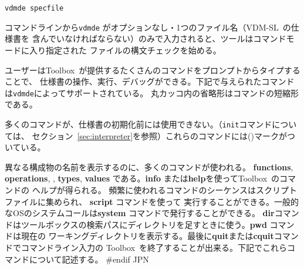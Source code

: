 \documentclass[\pformat,12pt]{article}
\newcommand{\vdmslpp}{VDM-SL}
\newcommand{\Toolbox}{Toolbox}
\newcommand{\vdmde}{vdmde}
\newcommand{\vdmslpp}{VDM++}
\newcommand{\Toolbox}{Toolbox}
\newcommand{\vdmde}{vppde}
\newcommand{\cmd}{\tt }
\begin{document}
{\tt \vdmde\ specfile}

コマンドラインから{\tt \vdmde} がオプションなし・1つのファイル名（\vdmslpp\ の仕様書を
含んでいなければならない）のみで入力されると、ツールはコマンドモードに入り指定された
ファイルの構文チェックを始める。

ユーザーは\Toolbox\ が提供するたくさんのコマンドをプロンプトからタイプすることで、
仕様書の操作、実行、デバッグができる。下記で与えられたコマンドは{\tt \vdmde}によってサポートされている。
丸カッコ内の省略形はコマンドの短縮形である。

多くのコマンドが、仕様書の初期化前には使用できない。（{\cmd init}コマンドについては、
セクション~\ref{sec:interpreter}を参照）これらのコマンドには({\tt *})マークがついている。

異なる構成物の名前を表示するのに、多くのコマンドが使われる。
\textbf{functions}, \textbf{operations}, 
,
\textbf{types}, \textbf{values}
である。\textbf{info} または\textbf{help}を使って\Toolbox\ のコマンドの
ヘルプが得られる。
頻繁に使われるコマンドのシーケンスはスクリプトファイルに集められ、 \textbf{script} コマンドを使って
実行することができる。一般的なOSのシステムコールは\textbf{system} コマンドで発行することができる。
\textbf{dir}コマンドはツールボックスの検索パスにディレクトリを足すときに使う。\textbf{pwd} コマンドは現在の
ワーキングディレクトリを表示する。最後に\textbf{quit}または\textbf{cquit}コマンドでコマンドライン入力の
\Toolbox\ を終了することが出来る。下記でこれらコマンドについて記述する。
#endif JPN
\end{document}

